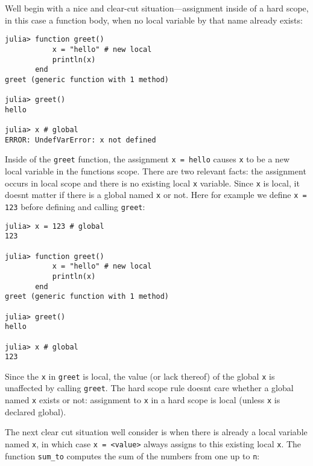 We{\textquotesingle}ll begin with a nice and clear-cut situation—assignment inside of a hard scope, in this case a function body, when no local variable by that name already exists:




\begin{verbatim}
julia> function greet()
           x = "hello" # new local
           println(x)
       end
greet (generic function with 1 method)

julia> greet()
hello

julia> x # global
ERROR: UndefVarError: x not defined
\end{verbatim}



Inside of the \texttt{greet} function, the assignment \texttt{x = {\textquotedbl}hello{\textquotedbl}} causes \texttt{x} to be a new local variable in the function{\textquotesingle}s scope. There are two relevant facts: the assignment occurs in local scope and there is no existing local \texttt{x} variable. Since \texttt{x} is local, it doesn{\textquotesingle}t matter if there is a global named \texttt{x} or not. Here for example we define \texttt{x = 123} before defining and calling \texttt{greet}:




\begin{verbatim}
julia> x = 123 # global
123

julia> function greet()
           x = "hello" # new local
           println(x)
       end
greet (generic function with 1 method)

julia> greet()
hello

julia> x # global
123
\end{verbatim}



Since the \texttt{x} in \texttt{greet} is local, the value (or lack thereof) of the global \texttt{x} is unaffected by calling \texttt{greet}. The hard scope rule doesn{\textquotesingle}t care whether a global named \texttt{x} exists or not: assignment to \texttt{x} in a hard scope is local (unless \texttt{x} is declared global).



The next clear cut situation we{\textquotesingle}ll consider is when there is already a local variable named \texttt{x}, in which case \texttt{x = <value>} always assigns to this existing local \texttt{x}.  The function \texttt{sum\_to} computes the sum of the numbers from one up to \texttt{n}:




